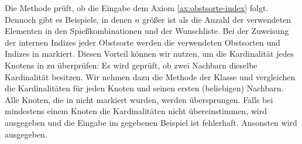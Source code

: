 Die Methode  prüft, ob die Eingabe dem Axiom \ref{ax:obstsorte-index} folgt.
Dennoch gibt es Beispiele, in denen $n$ größer ist als die Anzahl der verwendeten Elementen in den
Spießkombinationen und der Wunschliste.
Bei der Zuweisung der internen Indizes jeder Obstsorte werden die verwendeten Obstsorten und Indizes
in  markiert. Diesen Vorteil können wir nutzen, um die Kardinalität
jedes Knotens in  zu überprüfen: Es wird geprüft, ob zwei Nachbarn dieselbe Kardinalität besitzen.
Wir nehmen dazu die Methode  der Klasse  und vergleichen die
Kardinalitäten für jeden Knoten und seinen ersten (beliebigen) Nachbarn. 
Alle Knoten, die in  nicht markiert wurden, werden übersprungen.
Falls bei mindestens einem Knoten die Kardinalitäten nicht übereinstimmen, wird  ausgegeben und
die Eingabe im gegebenen Beispiel ist fehlerhaft.
Ansonsten wird  ausgegeben.

